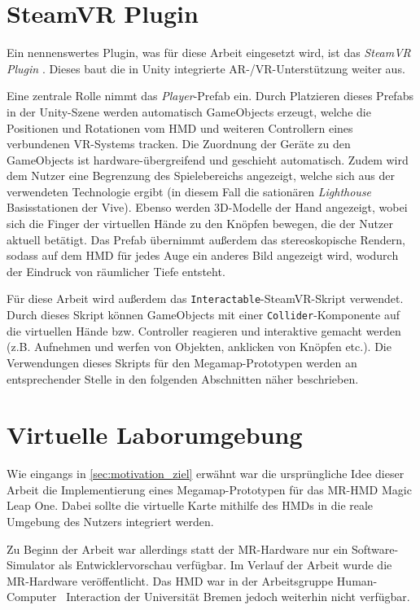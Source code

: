 \section{SteamVR Plugin}
Ein nennenswertes Plugin, was für diese Arbeit eingesetzt wird, ist das \emph{SteamVR Plugin} \autocite{ValveCorporation2018}.
Dieses baut die in Unity integrierte AR-/VR-Unterstützung weiter aus.

Eine zentrale Rolle nimmt das \emph{Player}-Prefab ein.
Durch Platzieren dieses Prefabs in der Unity-Szene werden automatisch GameObjects erzeugt, welche die Positionen und Rotationen vom HMD und weiteren Controllern eines verbundenen VR-Systems tracken.
Die Zuordnung der Geräte zu den GameObjects ist hardware-übergreifend und geschieht automatisch.
Zudem wird dem Nutzer eine Begrenzung des Spielebereichs angezeigt, welche sich aus der verwendeten Technologie ergibt (in diesem Fall die sationären \emph{Lighthouse} Basisstationen der Vive).
Ebenso werden 3D-Modelle der Hand angezeigt, wobei sich die Finger der virtuellen Hände zu den Knöpfen bewegen, die der Nutzer aktuell betätigt.
Das Prefab übernimmt außerdem das stereoskopische Rendern, sodass auf dem HMD für jedes Auge ein anderes Bild angezeigt wird, wodurch der Eindruck von räumlicher Tiefe entsteht.

Für diese Arbeit wird außerdem das \texttt{Interactable}-SteamVR-Skript verwendet.
Durch dieses Skript können GameObjects mit einer \texttt{Collider}-Komponente auf die virtuellen Hände bzw. Controller reagieren und interaktive gemacht werden (z.B. Aufnehmen und werfen von Objekten, anklicken von Knöpfen etc.).
Die Verwendungen dieses Skripts für den Megamap-Prototypen werden an entsprechender Stelle in den folgenden Abschnitten näher beschrieben.

\section{Virtuelle Laborumgebung}
Wie eingangs in \autoref{sec:motivation_ziel} erwähnt war die ursprüngliche Idee dieser Arbeit die Implementierung eines Megamap-Prototypen für das MR-HMD Magic Leap One.
Dabei sollte die virtuelle Karte mithilfe des HMDs in die reale Umgebung des Nutzers integriert werden.

Zu Beginn der Arbeit war allerdings statt der MR-Hardware nur ein Software-Simulator als Entwicklervorschau verfügbar.
Im Verlauf der Arbeit wurde die MR-Hardware veröffentlicht.
Das HMD war in der Arbeitsgruppe Human-Computer~ Interaction der Universität Bremen jedoch weiterhin nicht verfügbar.

